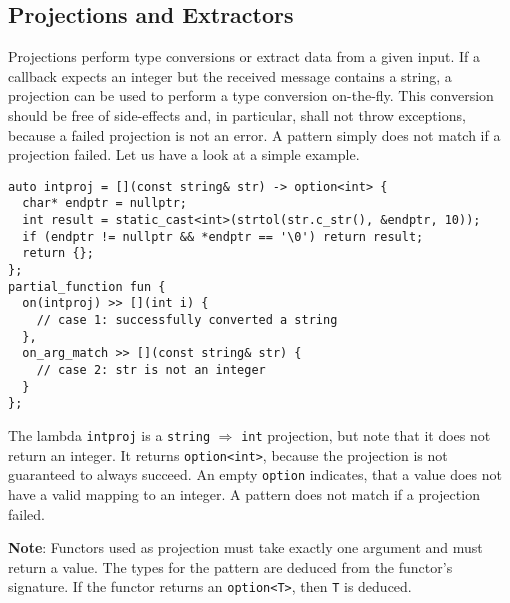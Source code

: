 \subsection{Projections and Extractors}

Projections perform type conversions or extract data from a given input.
If a callback expects an integer but the received message contains a string, a projection can be used to perform a type conversion on-the-fly.
This conversion should be free of side-effects and, in particular, shall not throw exceptions, because a failed projection is not an error.
A pattern simply does not match if a projection failed.
Let us have a look at a simple example.

\begin{lstlisting}
auto intproj = [](const string& str) -> option<int> {
  char* endptr = nullptr;
  int result = static_cast<int>(strtol(str.c_str(), &endptr, 10));
  if (endptr != nullptr && *endptr == '\0') return result;
  return {};
};
partial_function fun {
  on(intproj) >> [](int i) {
    // case 1: successfully converted a string
  },
  on_arg_match >> [](const string& str) {
    // case 2: str is not an integer
  }
};
\end{lstlisting}

The lambda \lstinline^intproj^ is a \lstinline^string^ $\Rightarrow$ \lstinline^int^ projection, but note that it does not return an integer.
It returns \lstinline^option<int>^, because the projection is not guaranteed to always succeed.
An empty \lstinline^option^ indicates, that a value does not have a valid mapping to an integer.
A pattern does not match if a projection failed.

\textbf{Note}: Functors used as projection must take exactly one argument and must return a value.
The types for the pattern are deduced from the functor's signature.
If the functor returns an \lstinline^option<T>^, then \lstinline^T^ is deduced.











